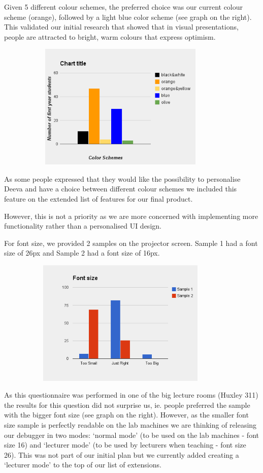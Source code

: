 \documentclass[11pt, a4paper]{article}
\begin{document}
\begin{description}
Given 5 different colour schemes, the preferred choice was our current colour scheme (orange), followed by a light blue color scheme (see graph on the right).
This validated our initial research that showed that in visual presentations, people are attracted to bright, warm colours that express optimism.
\begin{figure}[h!]
\centering
\includegraphics[height=60mm,width=100mm]{colours.png}
\end{figure}

As some people expressed that they would like the possibility to personalise Deeva and have a choice between different colour schemes we included this feature on the extended list of features for our final product.

However, this is not a priority as we are more concerned with implementing more functionality rather than a personalised UI design.

For font size, we provided 2 samples on the projector screen.
Sample 1 had a font size of 26px and Sample 2 had a font size of 16px.
\begin{figure}[h!]
\centering
\includegraphics[height=60mm,width=100mm]{fonts.png}
\end{figure}
As this questionnaire was performed in one of the big lecture rooms (Huxley 311) the results for this question did not surprise us, ie. people preferred the sample with the bigger font size (see graph on the right).
However, as the smaller font size sample is perfectly readable on the lab machines we are thinking of releasing our debugger in two modes: ‘normal mode’ (to be used on the lab machines - font size 16) and  ‘lecturer mode’ (to be used by lecturers when teaching - font size 26).
This was not part of our initial plan but we currently added creating a ‘lecturer mode’ to the top of our list of extensions.

\end{description}
\end{document}
